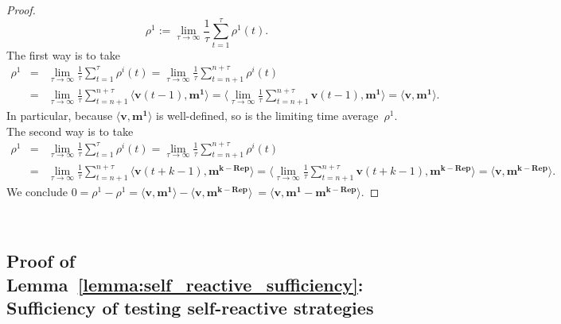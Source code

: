 \documentclass[9pt,twoside,lineno]{pnas-new}
\theoremstyle{plainCl1}
\theoremstyle{plainCl2}
\begin{document}
\begin{proof}
\begin{equation}
\rho^1 := \lim_{\tau \to \infty} \frac{1}{\tau} \sum_{t=1}^\tau \rho^1(t).
\end{equation}
The first way is to take
\begin{equation*}
\begin{array}{rcl}
\rho^1 &= &\displaystyle 
\lim_{\tau \to \infty} \frac{1}{\tau} \sum_{t=1}^\tau \rho^i(t) 
= \lim_{\tau \to \infty} \frac{1}{\tau} \sum_{t=n+1}^{n+\tau} \rho^i(t)\\[0.5cm]
&= &\displaystyle 
\lim_{\tau \to \infty} \frac{1}{\tau} \sum_{t=n+1}^{n+\tau}  \big\langle \mathbf{v}(t\!-\!1) , \mathbf{m^1}\big\rangle 
=  \big\langle  \lim_{\tau \to \infty} \frac{1}{\tau} \sum_{t=n+1}^{n+\tau} \mathbf{v}(t\!-\!1) , \mathbf{m^1}\big\rangle
= \big\langle \mathbf{v},\mathbf{m^1} \big\rangle.
\end{array}
\end{equation*}
In particular, because $\big\langle \mathbf{v},\mathbf{m^1} \big\rangle$ is well-defined, so is the limiting time average~$\rho^1$. The second way is to take
\begin{equation*}
\begin{array}{rcl}
\rho^1 &= &\displaystyle 
\lim_{\tau \to \infty} \frac{1}{\tau} \sum_{t=1}^\tau \rho^i(t) 
= \lim_{\tau \to \infty} \frac{1}{\tau} \sum_{t=n+1}^{n+\tau} \rho^i(t)\\[0.5cm]
&= &\displaystyle 
\lim_{\tau \to \infty} \frac{1}{\tau} \sum_{t=n+1}^{n+\tau}  \big\langle \mathbf{v}(t\!+\!k\!-\!1) ,  \mathbf{m^{k-\text{Rep}}}\big\rangle 
=  \big\langle  \lim_{\tau \to \infty} \frac{1}{\tau} \sum_{t=n+1}^{n+\tau} \mathbf{v}(t\!+\!k\!-\!1) ,  \mathbf{m^{k-\text{Rep}}}\big\rangle
= \big\langle \mathbf{v},  \mathbf{m^{k-\text{Rep}}} \big\rangle.
\end{array}
\end{equation*}
We conclude
$
0 = \rho^1 \!-\! \rho^1 = \big\langle \mathbf{v},\mathbf{m^1} \big\rangle\!-\!\big\langle \mathbf{v},  \mathbf{m^{k-\text{Rep}}} \big\rangle\ = \big\langle \mathbf{v}, \mathbf{m^1}\!-\!\mathbf{m^{k-\text{Rep}}} \big\rangle.
$
\end{proof}
~




\subsection{Proof of Lemma~\ref{lemma:self_reactive_sufficiency}: Sufficiency of testing self-reactive strategies}
\end{document}
